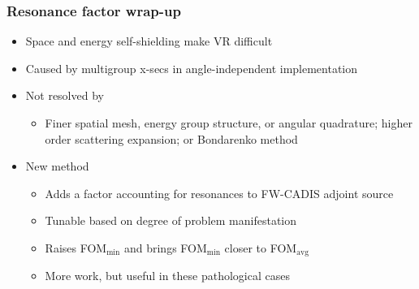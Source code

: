 \documentclass[xcolor=x11names,compress]{beamer}
\renewcommand{\(}{\begin{columns}}
\renewcommand{\)}{\end{columns}}
\newcommand{\<}[1]{\begin{column}{#1}}
\renewcommand{\>}{\end{column}}
\begin{document}
\begin{frame}[fragile]
  \frametitle{Resonance factor wrap-up}
  
  \begin{itemize}
  \item Space and energy self-shielding make VR difficult
  
  \item Caused by multigroup x-secs in angle-independent implementation
  
  \item Not resolved by
   \begin{itemize}
   \item Finer spatial mesh, energy group structure, or angular quadrature; higher order scattering expansion; or Bondarenko method
   \end{itemize}
  \pause 
  \item New method
   \begin{itemize}
  	\item Adds a factor accounting for resonances to FW-CADIS adjoint source
  	\item Tunable based on degree of problem manifestation
	\item \alert{Raises FOM$_{\min}$ and brings FOM$_{\min}$ closer to FOM$_{\text{avg}}$}
	\item More work, but useful in these pathological cases
   \end{itemize}
  \end{itemize}

\end{frame}


\end{document}
